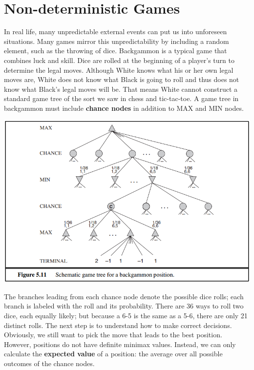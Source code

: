 \section{Non-deterministic Games}
In real life, many unpredictable external events can put us into unforeseen situations. Many games mirror this unpredictability by including a random element, such as the throwing of dice.\newline\newline
Backgammon is a typical game that combines luck and skill. Dice are rolled at the beginning of a player’s turn to determine the legal moves. Although White knows what his or her own legal moves are, White does not know what Black is going to roll and thus does not know what Black’s legal moves will be. That means White cannot construct a standard game tree of the sort we saw in chess and tic-tac-toe. A game tree in backgammon must include \textbf{chance nodes} in addition to MAX and MIN nodes.
\begin{center}
    \includegraphics[scale=0.8]{images/chance nodes.png}
\end{center}
The branches leading from each chance node denote the possible dice rolls; each branch is labeled with the roll and its probability. There are 36 ways to roll two dice, each equally likely; but because a 6-5 is the same as a 5-6,
there are only 21 distinct rolls.\newline\newline
The next step is to understand how to make correct decisions. Obviously, we still want to pick the move that leads to the best position. However, positions do not have definite minimax values. Instead, we can only calculate the \textbf{expected value} of a position: the average over all possible outcomes of the chance nodes.\newline\newline
